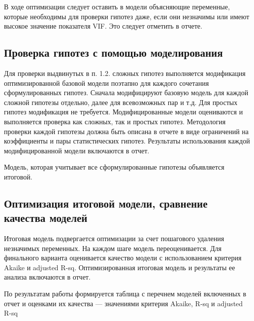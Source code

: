 \documentclass[12pt]{article}
\begin{document}
В ходе оптимизации следует оставить в модели объясняющие переменные, которые
необходимы для проверки гипотез даже, если они незначимы или имеют высокое
значение показателя VIF. Это следует отметить в отчете.

\subsection{Проверка гипотез с помощью моделирования}
Для проверки выдвинутых в п. 1.2. сложных гипотез выполняется модификация
оптимизированной базовой модели поэтапно для каждого сочетания сформулированных
гипотез. Сначала модифицируют базовую модель для каждой сложной гипотезы отдельно,
далее для всевозможных пар и т.д. Для простых гипотез модификация не требуется.
Модифицированные модели оцениваются и выполняется проверка как сложных, так и
простых гипотез. Методология проверки каждой гипотезы должна быть описана в отчете в
виде ограничений на коэффициенты и пары статистических гипотез. Результаты
использования каждой модифицированной модели включаются в отчет.

Модель, которая учитывает все сформулированные гипотезы объявляется итоговой.
\subsection{Оптимизация итоговой модели, сравнение качества моделей}
Итоговая модель подвергается оптимизации за счет пошагового удаления
незначимых переменных. На каждом шаге модель переоценивается. Для финального
варианта оценивается качество модели с использованием критерия Akaike и adjusted R-sq.
Оптимизированная итоговая модель и результаты ее анализа включаются в отчет.

По результатам работы формируется таблица с перечнем моделей включенных в
отчет и оценками их качества — значениями критерия Akaike, R-sq и adjusted R-sq
\end{document}
